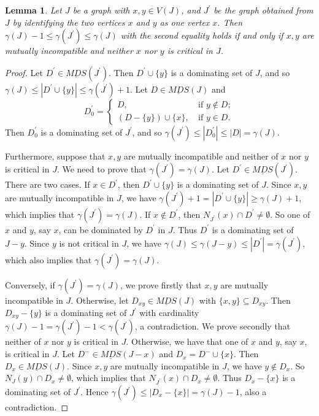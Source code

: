 \documentclass[a4paper,11pt]{article}
\numberwithin{equation}{section}
\newtheorem{lemma}[thm]{Lemma}
\begin{document}
\begin{lemma}\label{Jxy}
Let $J$ be a graph with $x,y\in V(J)$, and $J^{\prime}$ be the graph obtained from $J$ by identifying the two vertices $x$ and $y$ as one vertex $x$. Then $\gamma(J)-1\leq \gamma(J^{\prime})\leq \gamma(J)$ with the second equality holds if and only if $x,y$ are mutually incompatible and neither   $x$ nor $y$ is critical in $J$.
\end{lemma}
\begin{proof}
Let $D^{\prime}\in \underline{MDS}(J^{\prime})$. Then $D^{\prime}\cup\{y\}$ is a dominating set of $J$, and so $\gamma(J)\leq|D^{\prime}\cup\{y\}|\leq\gamma(J^{\prime})+1$. Let $D\in \underline{MDS}(J)$ and
\begin{equation*}
D_0^{\prime}=
\begin{cases}
D, &~\text{if~$y\notin D;$}\\
(D-\{y\})\cup\{x\}, &~\text{if~$y\in D$.}
\end{cases}
\end{equation*}
Then $D_0^{\prime}$ is a dominating set of $J^{\prime}$, and so $\gamma(J^{\prime})\leq|D_0^{\prime}|\leq|D|=\gamma(J)$.

\smallskip
Furthermore, suppose that $x,y$ are mutually incompatible and neither of $x$ nor $y$ is critical in $J$. We need to prove that $\gamma(J^{\prime})=\gamma(J)$. Let $D^{\prime}\in \underline{MDS}(J^{\prime})$. There are two cases. If $x\in D^{\prime}$, then $D^{\prime}\cup \{y\}$ is a dominating set of $J$. Since $x,y$ are mutually incompatible in $J$, we have $\gamma(J^{\prime})+1=|D^{\prime}\cup \{y\}|\geq\gamma(J)+1$, which implies that $\gamma(J^{\prime})=\gamma(J)$. If $x\notin D^{\prime}$, then $N_{J^{\prime}}(x)\cap D^{\prime}\neq\emptyset$. So one of $x$ and $y$, say $x$, can be dominated by $D^{\prime}$ in $J$. Thus $D^{\prime}$ is a dominating set of $J-y$. Since   $y$ is not critical in $J$,  we have $\gamma(J)\leq\gamma(J-y)\leq|D^{\prime}|=\gamma(J^{\prime})$, which also implies that $\gamma(J^{\prime})=\gamma(J)$.

Conversely, if $\gamma(J^{\prime})=\gamma(J)$, we prove firstly that $x,y$ are mutually incompatible in $J$. Otherwise, let $D_{xy}\in\underline{MDS}(J)$ with $\{x,y\}\subseteq D_{xy}$. Then $D_{xy}-\{y\}$ is a dominating set of $J^{\prime}$ with cardinality $\gamma(J)-1=\gamma(J^{\prime})-1<\gamma(J^{\prime})$, a contradiction. We prove secondly that neither of $x$ nor $y$ is critical in $J$. Otherwise, we have that one of $x$ and $y$, say $x$, is critical in $J$.  Let $D^{-}\in\underline{MDS}(J-x)$ and $D_x=D^{-}\cup\{x\}$. Then $D_x\in\underline{MDS}(J)$. Since $x,y$ are mutually incompatible in $J$, we have $y\notin D_x$. So $N_{J}(y)\cap D_x\neq\emptyset$, which implies that $N_{J^{\prime}}(x)\cap D_x\neq\emptyset$. Thus $D_x-\{x\}$ is a dominating set of $J^{\prime}$. Hence $\gamma(J^{\prime})\leq|D_x-\{x\}|=\gamma(J)-1$, also a contradiction.
\end{proof}
\end{document}
